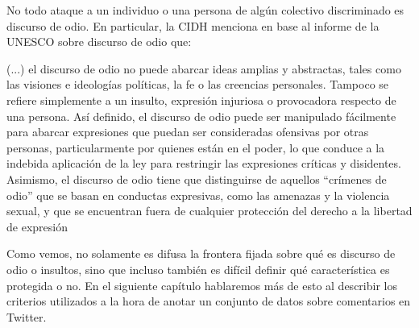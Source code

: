 No todo ataque a un individuo o una persona de algún colectivo discriminado es discurso de odio. En particular, la CIDH \cite{CIDH2015} menciona en base al informe de la UNESCO sobre discurso de odio \cite{gagliardone2015countering} que:

\begin{displayquote}[]
    (...) el discurso de odio no puede abarcar ideas amplias y abstractas, tales como las visiones e ideologías políticas, la fe o las creencias personales. Tampoco se refiere simplemente a un insulto, expresión injuriosa o provocadora respecto de una persona. Así definido, el discurso de odio puede ser manipulado fácilmente para abarcar expresiones que puedan ser consideradas ofensivas por otras personas, particularmente por quienes están en el poder, lo que conduce a la indebida aplicación de la ley para restringir las expresiones críticas y disidentes. Asimismo, el discurso de odio tiene que distinguirse de aquellos ``crímenes de odio'' que se basan en conductas expresivas, como las amenazas y la violencia sexual, y que se encuentran fuera de cualquier protección del derecho a la libertad de expresión
\end{displayquote}

Como vemos, no solamente es difusa la frontera fijada sobre qué es discurso de odio o insultos, sino que incluso también es difícil definir qué característica es protegida o no. En el siguiente capítulo hablaremos más de esto al describir los criterios utilizados a la hora de anotar un conjunto de datos sobre comentarios en Twitter.


